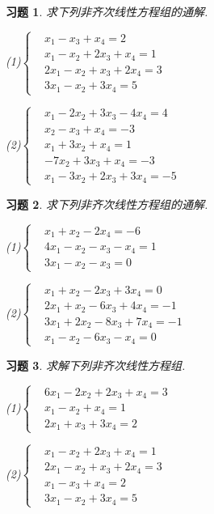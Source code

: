 \documentclass[a4paper]{book}
\newtheorem{ex}{习题}[chapter]
\begin{document}
\begin{ex}\label{5.9}
求下列非齐次线性方程组的通解.

(1)$\left\{\begin{aligned}& x_1      - x_3+ x_4=2 \\& x_1-x_2+ 2x _3+ x_4=1 \\&2x_1-x_2+ x_3+2x_4=3 \\&3x_1-x_2      +3x_4=5    \end{aligned}\right.$

(2)$\left\{\begin{aligned}& x_1-2x_2+3x_3-4x_4= 4 \\&       x _2- x_3+ x_4=-3 \\& x_1+3x_2      + x_4= 1 \\&    -7x_2+3x_3+ x_4=-3 \\& x_1-3x_2+2x_3+3x_4=-5     \end{aligned}\right.$
\end{ex}

\begin{ex}\label{5.10}
求下列非齐次线性方程组的通解.

(1)$\left\{\begin{aligned}&x_1+x_2     -2x_4=-6 \\&4x_1-x_2-x_3- x_4= 1 \\&3x_1-x_2-x_3      = 0     \end{aligned}\right.$

(2)$\left\{\begin{aligned}&x_1+ x_2-2x_3+3x_4= 0 \\&2x_1+ x_2-6x_3+4x_4=-1 \\& 3x_1+2x _2-8x_3+7x_4=-1 \\& x_1- x_2-6x_3- x_4= 0     \end{aligned}\right.$
\end{ex}

\begin{ex}\label{5.11}
求解下列非齐次线性方程组.

(1)$\left\{\begin{aligned}&6x_1-2x_2+2x_3+ x_4=3 \\& x_1- x_2      + x_4=1 \\&2x_1      + x_3+3x_4=2     \end{aligned}\right.$

(2)$\left\{\begin{aligned}&x_1- x_2+2x_3+ x_4=1 \\&2x_1- x_2+ x_3+2x_4=3 \\& x_1- x_3+ x_4=2 \\&3x_1-x_2     +3x_4=5     \end{aligned}\right.$
\end{ex}
\end{document}
